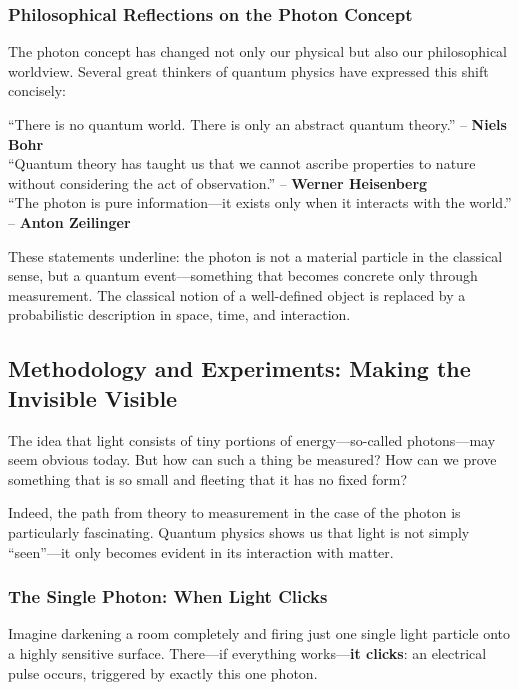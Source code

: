 \subsubsection{Philosophical Reflections on the Photon Concept}

The photon concept has changed not only our physical but also our philosophical worldview. Several great thinkers of quantum physics have expressed this shift concisely:

\begin{tcolorbox}[didaktikbox, title=What Is Reality in Quantum Physics?]
	\label{box:realitaet}
	“There is no quantum world. There is only an abstract quantum theory.” – \textbf{Niels Bohr} \cite{bohr1934} \\
	“Quantum theory has taught us that we cannot ascribe properties to nature without considering the act of observation.” – \textbf{Werner Heisenberg} \cite{heisenberg1959} \\
	“The photon is pure information—it exists only when it interacts with the world.” – \textbf{Anton Zeilinger} \cite{zeilinger2005}
\end{tcolorbox}

These statements underline: the photon is not a material particle in the classical sense, but a quantum event—something that becomes concrete only through measurement. The classical notion of a well-defined object is replaced by a probabilistic description in space, time, and interaction.
\newpage
\noindent
\subsection{Methodology and Experiments: Making the Invisible Visible}

The idea that light consists of tiny portions of energy—so-called photons—may seem obvious today. But how can such a thing be measured? How can we prove something that is so small and fleeting that it has no fixed form?

Indeed, the path from theory to measurement in the case of the photon is particularly fascinating. Quantum physics shows us that light is not simply “seen”—it only becomes evident in its interaction with matter.

\subsubsection{The Single Photon: When Light Clicks}
Imagine darkening a room completely and firing just one single light particle onto a highly sensitive surface. There—if everything works—\newline \textbf{it clicks}: an electrical pulse occurs, triggered by exactly this one photon.

